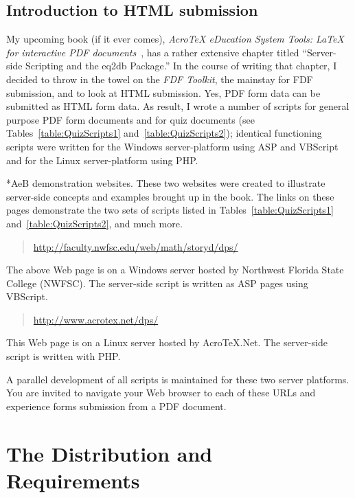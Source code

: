 \documentclass{article}
\makeatletter
\def\AEBBook{\textsl{{Acro\!\TeX} eDucation System Tools: {\LaTeX} for interactive PDF documents}}
\renewcommand{\paragraph}
    {\@startsection{paragraph}{4}{0pt}{6pt}{-3pt}
    {\normalfont\normalsize\bfseries}}
\let\pkg\textsf
\let\app\textsf
\def\AEB{\textsf{AeB}}
\def\AcroTeX{Acro\!\TeX}
\def\PDF{PDF}\def\URL{URL}
\def\bNH{\begin{NoHyper}}\def\eNH{\end{NoHyper}}
\def\nhurl#1{\bNH\url{#1}\eNH}
\makeatother
\begin{document}
\subsection{Introduction to HTML submission}\label{s:IntroHTMLSub}

My upcoming book (if it ever comes), \AEBBook~\cite{book:AEBB}, has a rather extensive chapter
titled ``Server-side Scripting and the \pkg{eq2db} Package.'' In the course
of writing that chapter, I decided to throw in the towel on the \textsl{FDF
Toolkit}, the mainstay for FDF submission, and to look at HTML submission.
Yes, PDF form data can be submitted as HTML form data. As result, I wrote a
number of scripts for general purpose PDF form documents and for quiz
documents (see Tables~\ref{table:QuizScripts1} and~\ref{table:QuizScripts2});
identical functioning scripts were written for the \app{Windows}
server-platform using \app{ASP} and \app{VBScript} and for the \app{Linux}
server-platform using \app{PHP}.

\paragraph*{{\AEB} demonstration websites.}\label{para:SSDemoPages}\leavevmode
These two websites were created to illustrate server-side concepts and examples brought up
in the book. The links on these pages demonstrate the two sets of scripts
listed in Tables~\ref{table:QuizScripts1} and~\ref{table:QuizScripts2}, and much more.
\begin{quote}
\nhurl{http://faculty.nwfsc.edu/web/math/storyd/dps/}
\end{quote}
The above Web page is on a \app{Windows} server hosted by Northwest Florida State
College (NWFSC). The server-side
script is written as ASP pages using VBScript.
\begin{quote}
\nhurl{http://www.acrotex.net/dps/}
\end{quote}
This Web page is on a \app{Linux} server hosted by {\AcroTeX.Net}. The
server-side script is written with PHP.

A parallel development of all scripts is maintained for these two server
platforms. You are invited to navigate your Web browser to each of these
{\URL}s and experience forms submission from a {\PDF} document.


\section{The Distribution and Requirements}
\end{document}
